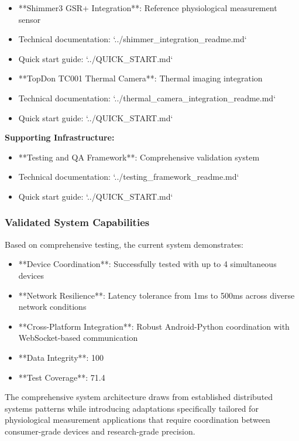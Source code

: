 \documentclass[11pt,a4paper]{report}
\begin{document}
\begin{itemize}
\item **Shimmer3 GSR+ Integration**: Reference physiological measurement sensor
\item Technical documentation: `../shimmer_integration_readme.md`
\item Quick start guide: `../QUICK_START.md`

\item **TopDon TC001 Thermal Camera**: Thermal imaging integration
\item Technical documentation: `../thermal_camera_integration_readme.md`
\item Quick start guide: `../QUICK_START.md`

\end{itemize}
\textbf{Supporting Infrastructure:}

\begin{itemize}
\item **Testing and QA Framework**: Comprehensive validation system
\item Technical documentation: `../testing_framework_readme.md`
\item Quick start guide: `../QUICK_START.md`

\end{itemize}
\subsubsection{Validated System Capabilities}

Based on comprehensive testing, the current system demonstrates:

\begin{itemize}
\item **Device Coordination**: Successfully tested with up to 4 simultaneous devices
\item **Network Resilience**: Latency tolerance from 1ms to 500ms across diverse network conditions
\item **Cross-Platform Integration**: Robust Android-Python coordination with WebSocket-based communication
\item **Data Integrity**: 100%
\item **Test Coverage**: 71.4%

\end{itemize}
The comprehensive system architecture draws from established distributed systems patterns while introducing adaptations
specifically tailored for physiological measurement applications that require coordination between consumer-grade
devices and research-grade precision.
\end{document}
